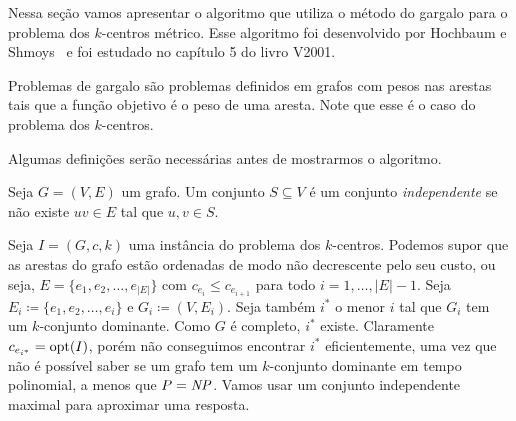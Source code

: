 Nessa seção vamos apresentar o algoritmo que utiliza o método do gargalo para o problema dos $k$-centros métrico. Esse algoritmo foi desenvolvido por Hochbaum e Shmoys~\cite{HSBottle} e foi estudado no capítulo 5 do livro V2001.

Problemas de gargalo são problemas definidos em grafos com pesos nas arestas tais que a função objetivo é o peso de uma aresta. Note que esse é o caso do problema dos $k$-centros.

Algumas definições serão necessárias antes de mostrarmos o algoritmo.
\begin{definition}
    Seja $G = (V,E)$ um grafo. Um conjunto $S \subseteq V$ é um conjunto \emph{independente} se não existe $uv \in E$ tal que $u,v \in S$.
\end{definition}
Seja $I = (G,c,k)$ uma instância do problema dos $k$-centros. Podemos supor que as arestas do grafo estão ordenadas de modo não decrescente pelo seu custo, ou seja, ${E = \{e_1,e_2,\ldots,e_{|E|}\}}$ com $c_{e_i} \leq c_{e_{i+1}}$ para todo $i = 1,\ldots, |E|-1$.
Seja $E_i \coloneqq \{e_1,e_2,\ldots,e_i\}$ e $G_i \coloneqq (V,E_i)$. Seja também $i^*$ o menor $i$ tal que $G_i$ tem um $k$-conjunto dominante. Como $G$ é completo, $i^*$ existe. Claramente $c_{e_{i^*}} = \mathrm{opt}(I)$, porém não conseguimos encontrar $i^*$ eficientemente, uma vez que não é possível saber se um grafo tem um $k$-conjunto dominante em tempo polinomial, a menos que $P = \mathit{NP}$. Vamos usar um conjunto independente maximal para aproximar uma resposta.


